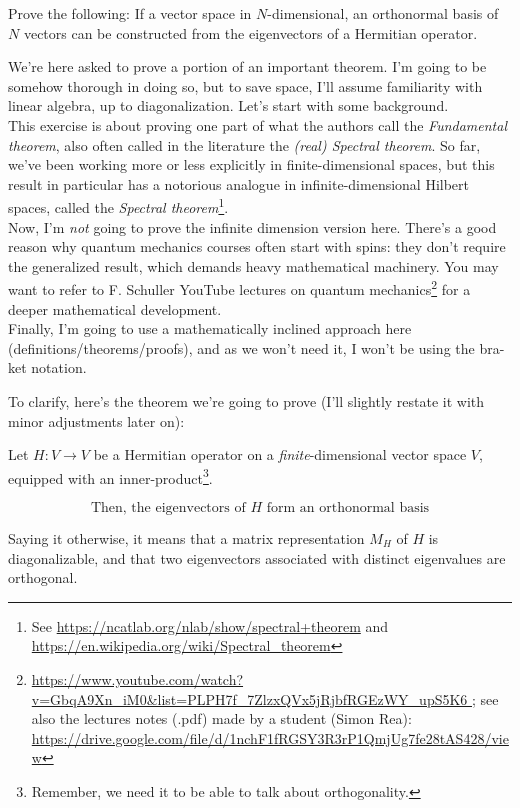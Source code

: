 \documentclass[solutions.tex]{subfiles}
\begin{document}
\maketitle
\begin{exercise}
Prove the following: If a vector space in $N$-dimensional, an
orthonormal basis of $N$ vectors can be constructed from the eigenvectors
of a Hermitian operator.
\end{exercise}

We're here asked to prove a portion of an important theorem. I'm
going to be somehow thorough in doing so, but to save space,
I'll assume familiarity with linear algebra, up to diagonalization.
Let's start with some background. \\

This exercise is about proving one part of what the authors call the
\textit{Fundamental theorem}, also often called in the literature the
\textit{(real) Spectral theorem}. So far, we've been working more or
less explicitly in finite-dimensional spaces, but this result in
particular has a notorious analogue in infinite-dimensional Hilbert
spaces, called the \textit{Spectral theorem}\footnote{See \url{
https://ncatlab.org/nlab/show/spectral+theorem} and \url{
https://en.wikipedia.org/wiki/Spectral_theorem}}. \\

Now, I'm \textit{not} going to prove the infinite dimension
version here. There's a good reason why quantum mechanics courses
often start with spins: they don't require the generalized
result, which demands heavy mathematical machinery.
You may want to refer to F. Schuller YouTube lectures on
quantum mechanics\footnote{\url{
https://www.youtube.com/watch?v=GbqA9Xn_iM0&list=PLPH7f_7ZlzxQVx5jRjbfRGEzWY_upS5K6
}; see also the lectures notes (.pdf) made by a student (Simon Rea):
\url{https://drive.google.com/file/d/1nchF1fRGSY3R3rP1QmjUg7fe28tAS428/view}}
for a deeper mathematical development. \\

Finally, I'm going to use a mathematically inclined approach
here (definitions/theorems/proofs), and as we won't need
it, I won't be using the bra-ket notation.

\hrr

To clarify, here's the theorem we're going to prove (I'll slightly
restate it with minor adjustments later on):

\begin{theorem} Let $H : V \rightarrow V$ be a Hermitian operator on a
\textit{finite}-dimensional vector space $V$, equipped with an
inner-product\footnote{Remember, we need it to be able to talk
about orthogonality.}.

\[
	\boxed{\text{Then, the eigenvectors of $H$ form an orthonormal basis}}
\]

Saying it otherwise, it means that a matrix representation $M_H$ of $H$
is diagonalizable, and that two eigenvectors associated with distinct
eigenvalues are orthogonal.
\end{theorem}
\end{document}
